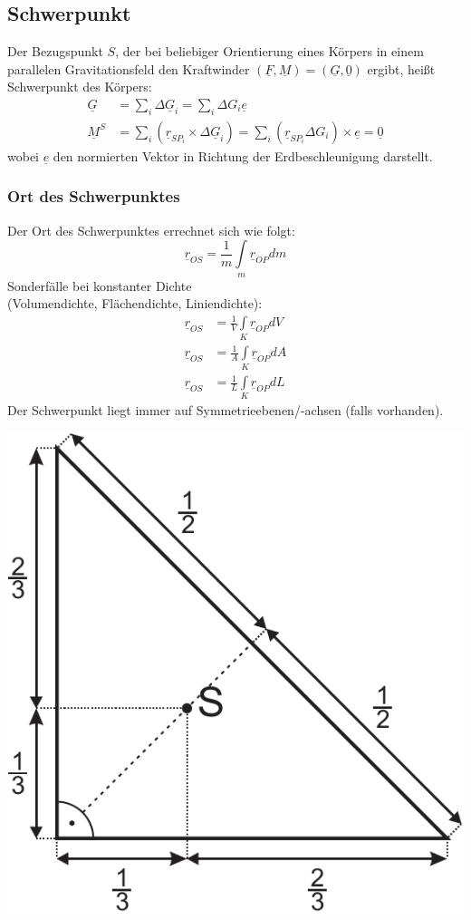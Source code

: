 \documentclass[a4paper,twocolumn,10pt]{article}
\begin{document}
\subsection{Schwerpunkt}
Der Bezugspunkt $S$, der bei beliebiger Orientierung eines Körpers in einem parallelen Gravitationsfeld den Kraftwinder $(\underline{F},\underline{M})=(\underline{G},\underline{0})$ ergibt, heißt Schwerpunkt des Körpers:
\begin{equation*}
\begin{split}
\underline{G}&=\sum\limits_i\Delta\underline{G}_i=\sum\limits_i\Delta G_i\underline{e}\\
\underline{M}^S&=\sum\limits_i (\underline{r}_{SP_i}\times\Delta\underline{G}_i)=\sum\limits_i (\underline{r}_{SP_i}\Delta G_i)\times \underline{e}=\underline{0}
\end{split}
\end{equation*}
wobei $\underline{e}$ den normierten Vektor in Richtung der Erdbeschleunigung darstellt.

\subsubsection{Ort des Schwerpunktes}
Der Ort des Schwerpunktes errechnet sich wie folgt:
\begin{equation*}
\underline{r}_{OS}=\frac{1}{m}\int\limits_m\underline{r}_{OP}dm
\end{equation*}
Sonderfälle bei konstanter Dichte\\
(Volumendichte, Flächendichte, Liniendichte):
\begin{equation*}
\begin{split}
\underline{r}_{OS} &=\frac{1}{V}\int\limits_K \underline{r}_{OP}dV\\
\underline{r}_{OS}&= \frac{1}{A}\int\limits_K\underline{r}_{OP}dA\\
\underline{r}_{OS}&=\frac{1}{L}\int\limits_K\underline{r}_{OP}dL
\end{split}
\end{equation*}
Der Schwerpunkt liegt immer auf Symmetrieebenen/-achsen (falls vorhanden).
\begin{center}
\includegraphics[width=0.5\columnwidth]{Grafiken/Schwerpunkt_Dreieck}
\end{center}
\end{document}
